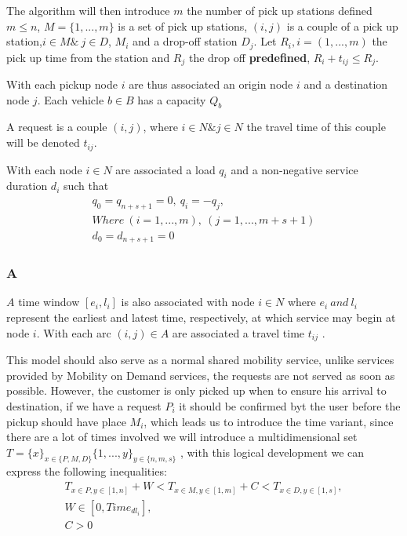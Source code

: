 \documentclass{article}
\begin{document}
The algorithm will then introduce $m$ the number of pick up stations defined $m \leqslant n$, $M = \{ 1, ..., m \}$ is a set of pick up stations,  $(i,j)$ is a couple of a pick up station,$i \in M \& \ j \in D$, $M_i$ and a drop-off station $D_j$.
Let $R_i, i = (1, ... , m)$ the pick up time from the station and $R_j$ the drop off \textbf{predefined}, $R_i + t_{ij} \leqslant R_j $.

With each pickup node $i$ are thus associated an origin node $i$ and a destination node $j$. Each vehicle $b \in B$ has a capacity $Q_b$

A request is a couple $(i,j)$, where $i \in N \& j \in N $ the travel time of this couple will be denoted $t_{ij}$.

With each node $i \in N$ are associated a load $q_i$ and a non-negative service duration $d_i$ such that 
\begin{equation*}
\begin{array}{l}
q_0 = q_{n+s+1} = 0, \ q_i = - q_j,\\
Where \  (i = 1, . . . , m),\ (j = 1, ... , m+s+1) \\
d_0 = d_{n+s+1} = 0
\end{array}
\end{equation*}

\subsubsection*{A}

$A$ time window $[e_i, l_i]$ is also associated with node $i \in N$ where $ e_i\ and\ l_i$ represent the earliest and latest time,
respectively, at which service may begin at node $i$. With each arc $(i, j) \in A$ are associated a travel time $t_{ij}$ .


This model should also serve as a normal shared mobility service, unlike services provided by Mobility on Demand services, the requests are not served as soon as possible. However, the customer is only picked up when to ensure his arrival to destination, 
if we have a request $P_i$  it should be confirmed byt the user before the pickup should have place $M_i$, which leads us to introduce the time variant, since there are a lot of times involved we will introduce a multidimensional set 
$T ={ \{x\}}_{x \in \{P,M,D\}} {\{1, ..., y\}}_{y \in \{n,m,s\}}$ , with this logical development we can express the following inequalities: \\ 
\begin{equation}
\begin{array}{l}
{T}_{x \in P, y \in [1,n]} + W < {T}_{x \in M, y \in[1,m]} + C < {T}_{x \in D, y \in [1,s]},\\
W \in [0,Time_{dl_{i}}],\\
C > 0
\label{eq:time_constraint}
\end{array}
\end{equation}
\end{document}
